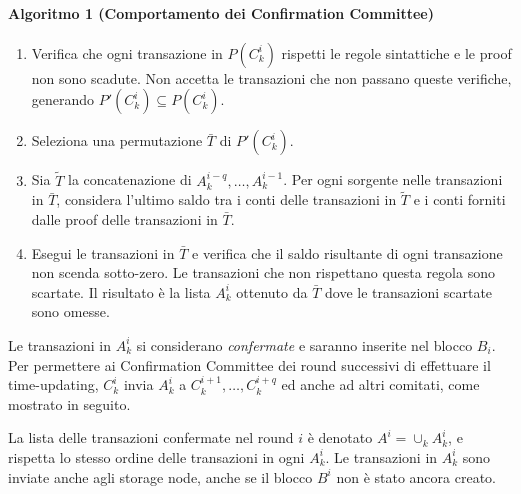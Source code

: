 \paragraph*{Algoritmo 1 (Comportamento dei Confirmation Committee)}
\begin{enumerate}
	\item Verifica che ogni transazione in $P(C_k^i)$ rispetti le regole sintattiche e le proof non sono scadute. Non accetta le transazioni che non passano queste verifiche, generando $P'(C_k^i) \subseteq P(C_k^i)$.
	\item Seleziona una permutazione $\bar{T}$ di $P'(C_k^i)$.
	\item Sia $\widetilde{T}$ la concatenazione di $A_k^{i-q}, \dots, A_k^{i-1}$. Per ogni sorgente nelle transazioni in $\bar{T}$, considera l'ultimo saldo tra i conti delle transazioni in $\widetilde{T}$ e i conti forniti dalle proof delle transazioni in $\bar{T}$.
	\item Esegui le transazioni in $\bar{T}$ e verifica che il saldo risultante di ogni transazione non scenda sotto-zero. Le transazioni che non rispettano questa regola sono scartate. Il risultato è la lista $A_k^i$ ottenuto da $\bar{T}$ dove le transazioni scartate sono omesse.	
\end{enumerate}

Le transazioni in $A_k^i$ si considerano \emph{confermate} e saranno inserite nel blocco $B_i$. Per permettere ai Confirmation Committee dei round successivi di effettuare il time-updating, $C_k^i$ invia $A_k^i$ a $C_k^{i+1}, \dots, C_k^{i+q}$ ed anche ad altri comitati, come mostrato in seguito.

La lista delle transazioni confermate nel round $i$ è denotato $A^i = \cup_k A_k^i$, e rispetta lo stesso ordine delle transazioni in ogni $A_k^i$. Le transazioni in $A_k^i$ sono inviate anche agli storage node, anche se il blocco $B^i$ non è stato ancora creato.

